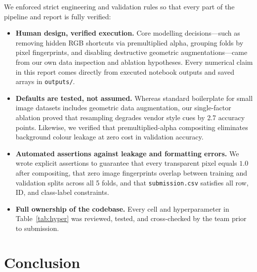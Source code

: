 \documentclass[11pt,a4paper]{article}
\newcommand{\code}[1]{\texttt{\small #1}}
\begin{document}
We enforced strict engineering and validation rules so that every part of the pipeline and report is
fully verified:
\begin{itemize}
  \item \textbf{Human design, verified execution.} Core modelling decisions---such as removing hidden
  RGB shortcuts via premultiplied alpha, grouping folds by pixel fingerprints, and disabling destructive
  geometric augmentations---came from our own data inspection and ablation hypotheses. Every numerical
  claim in this report comes directly from executed notebook outputs and saved arrays in \code{outputs/}.
  \item \textbf{Defaults are tested, not assumed.} Whereas standard boilerplate for small image datasets
  includes geometric data augmentation, our single-factor ablation proved that resampling degrades vendor
  style cues by 2.7 accuracy points. Likewise, we verified that premultiplied-alpha compositing eliminates
  background colour leakage at zero cost in validation accuracy.
  \item \textbf{Automated assertions against leakage and formatting errors.} We wrote explicit assertions
  to guarantee that every transparent pixel equals $1.0$ after compositing, that zero image fingerprints
  overlap between training and validation splits across all 5 folds, and that \code{submission.csv}
  satisfies all row, ID, and class-label constraints.
  \item \textbf{Full ownership of the codebase.} Every cell and hyperparameter in Table~\ref{tab:hyper}
  was reviewed, tested, and cross-checked by the team prior to submission.
\end{itemize}

\section{Conclusion}
\label{sec:conclusion}
\end{document}
